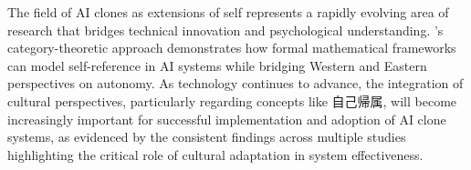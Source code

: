 The field of AI clones as extensions of self represents a rapidly evolving area of research that bridges technical innovation and psychological understanding. \citet{hirota2024self}'s category-theoretic approach demonstrates how formal mathematical frameworks can model self-reference in AI systems while bridging Western and Eastern perspectives on autonomy. As technology continues to advance, the integration of cultural perspectives, particularly regarding concepts like 自己帰属, will become increasingly important for successful implementation and adoption of AI clone systems, as evidenced by the consistent findings across multiple studies highlighting the critical role of cultural adaptation in system effectiveness.
